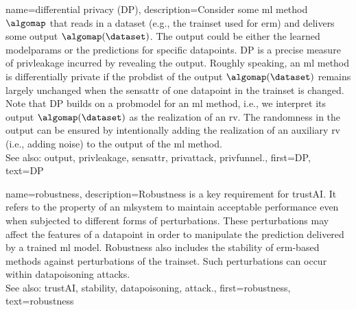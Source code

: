 {name={differential privacy (DP)},
	description={Consider some \gls{ml} method $\algomap$ 
  		that reads in a \gls{dataset} (e.g., the \gls{trainset} 
  		used for \gls{erm}) and delivers some \gls{output} $\algomap(\dataset)$. The \gls{output} 
  		could be either the learned \glspl{modelparam} or the \glspl{prediction} for specific \glspl{datapoint}. 
  		DP is a precise \gls{measure} of \gls{privleakage} incurred by revealing the 
  		\gls{output}. Roughly speaking, an \gls{ml} method is differentially private if the \gls{probdist} 
  		of the \gls{output} $\algomap(\dataset)$ remains largely unchanged when the \gls{sensattr} 
  		of one \gls{datapoint} in the \gls{trainset} is changed. Note that DP 
  		builds on a \gls{probmodel} for an \gls{ml} method, i.e., we interpret its \gls{output} $\algomap(\dataset)$ 
  		as the \gls{realization} of an \gls{rv}. The randomness in the \gls{output} can be ensured 
  		by intentionally adding the \gls{realization} of an auxiliary \gls{rv} (i.e., adding noise) to 
  		the \gls{output} of the \gls{ml} method.
				\\ 
		See also: \gls{output}, \gls{privleakage}, \gls{sensattr}, \gls{privattack}, \gls{privfunnel}.}, 
  	first={DP}, 
  	text={DP} 
}

{name={robustness},
	description={Robustness is a key requirement for \gls{trustAI}. It
		refers to the property of an \gls{mlsystem} to maintain acceptable performance even when 
		subjected to different forms of perturbations. These perturbations may affect the \glspl{feature} 
		of a \gls{datapoint} in order to manipulate the \gls{prediction} delivered by a trained \gls{ml} \gls{model}. 
		Robustness also includes the \gls{stability} of \gls{erm}-based methods against perturbations 
		of the \gls{trainset}. Such perturbations can occur within \gls{datapoisoning} \glspl{attack}. 
		\\ 
		See also: \gls{trustAI}, \gls{stability}, \gls{datapoisoning}, \gls{attack}.}, 
	first={robustness}, 
	text={robustness} 
}

